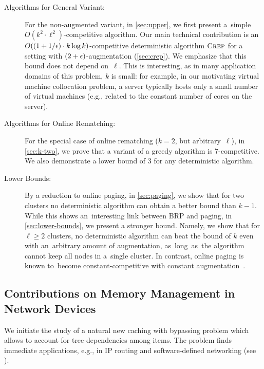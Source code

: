 \begin{description}

\item[Algorithms for General Variant:]
For the non-augmented variant, in \ref{sec:upper}, we first present a~simple
$O(k^2 \cdot \ell^2)$-competitive algorithm. Our main technical contribution
is an $O((1+1/\epsilon) \cdot k \log{k})$-competitive deterministic algorithm
$\textsc{Crep}$ for a setting with $(2+\epsilon)$-augmentation (\ref{sec:crep}).
We emphasize that this bound does not depend on~$\ell$. This is interesting,
as in many application domains of this problem, $k$ is small: for example, in
our motivating virtual machine collocation problem, a server typically hosts
only a small number of virtual machines (e.g., related to the constant number
of cores on the server).

\item[Algorithms for Online Rematching:]
For the special case of online rematching ($k=2$, but arbitrary~$\ell$), in
\ref{sec:k-two}, we prove that a variant of a greedy algorithm is
7-competitive. We also demonstrate a lower bound of 3 for any deterministic
algorithm.

\item[Lower Bounds:]
By a reduction to online paging, in \ref{sec:paging}, we show that
for two clusters no deterministic algorithm can obtain a better bound than
$k-1$. While this shows an~interesting link between BRP and paging, in
\ref{sec:lower-bounds}, we present a stronger bound. Namely, we
show that for $\ell \geq 2$ clusters, no deterministic algorithm can beat the
bound of $k$ even with an~arbitrary amount of augmentation, as~long~as~the
algorithm cannot keep all nodes in a~single cluster. In contrast, online
paging is known to~become constant-competitive with constant
augmentation~\cite{SleTar85}.

\end{description}




\subsection{Contributions on Memory Management in Network Devices}


We initiate the study of a natural new caching with bypassing problem which
allows to account for tree-dependencies among items. The problem finds
immediate applications, e.g., in IP routing and software-defined networking
(see ).

